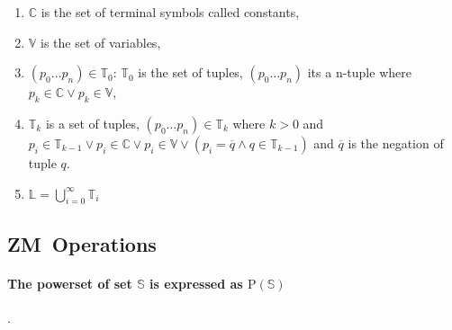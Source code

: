 \documentclass[11pt,a4paper]{report}
\newcommand{\zm}{ZM}
\newcommand{\var}[1]{`#1}
\begin{document}
\begin{enumerate}
\item $\mathbb{C}$ is the set of terminal symbols called constants,
\item $\mathbb{V}$ is the set of variables,
\item $(p_{0} \ldots p_{n}) \in \mathbb{T}_{0}$: $\mathbb{T}_{0}$ is the set of tuples, $(p_{0} \ldots p_{n})$ its a n-tuple where 
$p_k \in \mathbb{C} \vee p_k \in \mathbb{V}$,
\item $\mathbb{T}_{k}$ is a set of tuples, $(p_{0} \ldots p_{n}) \in \mathbb{T}_{k}$ where $k > 0$ and
$p_{i} \in \mathbb{T}_{k-1} \vee p_{i} \in \mathbb{C} \vee p_{i} \in \mathbb{V} \vee (p_{i} = \overline{q} \wedge q \in \mathbb{T}_{k-1})$ and $\overline{q}$ is the 
negation of tuple $q$.
\item $\mathbb{L} = \bigcup\limits_{i=0}^{\infty} \mathbb{T}_{i}$
\end{enumerate}



\subsection{\zm\ Operations}

\paragraph{The powerset of set $\mathbb{S}$ is expressed as $\mathrm{P}(\mathbb{S})$}.
\end{document}
